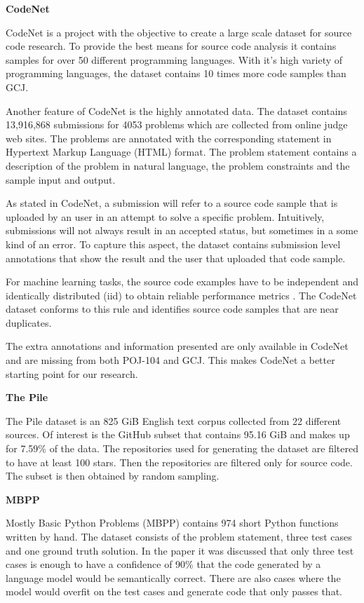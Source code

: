 \documentclass[12pt,a4paper]{report}
\begin{document}
\textbf{CodeNet} 

CodeNet \cite{puri2021codenet} is a project with the objective to create a large scale dataset for source code research. To provide the best means for source code analysis it contains samples for over 50 different programming languages. With it's high variety of programming languages, the dataset contains 10 times more code samples than GCJ. 

Another feature of CodeNet is the highly annotated data. The dataset contains 13,916,868 submissions for 4053 problems which are collected from online judge web sites. The problems are annotated with the corresponding statement in Hypertext Markup Language (HTML) format. The problem statement contains a description of the problem in natural language, the problem constraints and the sample input and output.

As stated in CodeNet, a submission will refer to a source code sample that is uploaded by an user in an attempt to solve a specific problem. Intuitively, submissions will not always result in an accepted status, but sometimes in a some kind of an error. To capture this aspect, the dataset contains submission level annotations that show the result and the user that uploaded that code sample.

For machine learning tasks, the source code examples have to be independent and identically distributed (iid) to obtain reliable performance metrics \cite{10.1145/3359591.3359735}. The CodeNet dataset conforms to this rule and identifies source code samples that are near duplicates.

The extra annotations and information presented are only available in CodeNet and are missing from both POJ-104 and GCJ. This makes CodeNet a better starting point for our research.

\textbf{The Pile}

The Pile \cite{gao2020pile} dataset is an 825 GiB English text corpus collected from 22 different sources. Of interest is the GitHub subset that contains 95.16 GiB and makes up for 7.59\% of the data. The repositories used for generating the dataset are filtered to have at least 100 stars. Then the repositories are filtered only for source code. The subset is then obtained by random sampling.

\textbf{MBPP}

Mostly Basic Python Problems (MBPP) \cite{austin2021program} contains 974 short Python functions written by hand. The dataset consists of the problem statement, three test cases and one ground truth solution. In the paper it was discussed that only three test cases is enough to have a confidence of 90\% that the code generated by a language model would be semantically correct. There are also cases where the model would overfit on the test cases and generate code that only passes that.
\end{document}
